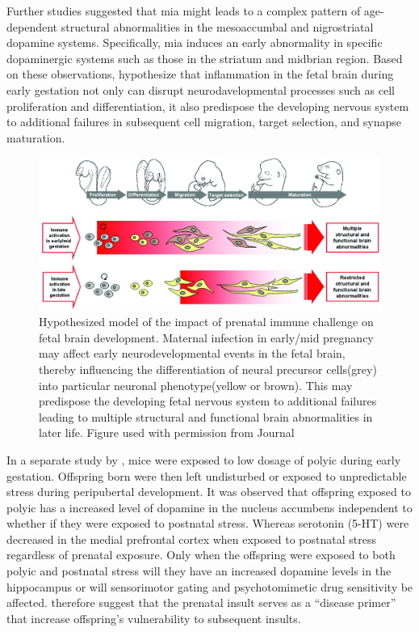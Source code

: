 \documentclass[12pt]{book}
\begin{document}
	Further studies suggested that \gls{mia} might leads to a complex pattern of age-dependent structural abnormalities in the mesoaccumbal and nigrostriatal dopamine systems\citep{Vuillermot2010}.
	Specifically, \gls{mia} induces an early abnormality in specific dopaminergic systems such as those in the striatum and midbrian region\citep{Vuillermot2010}.
	Based on these observations, \citet{Meyer2007a} hypothesize that inflammation in the fetal brain during early gestation not only can disrupt neurodavelopmental processes such as cell proliferation and differentiation, it also predispose the developing nervous system to additional failures in subsequent cell migration, target selection, and synapse maturation\citep{Meyer2007a}.
	\begin{figure}
		\centering
		\includegraphics[width=\textwidth]{figure/mia_impact.jpg}
		\caption[Hypothesized model of the impact of prenatal immune challenge on fetal brain development]{Hypothesized model of the impact of prenatal immune challenge on fetal brain development.
			Maternal infection in early/mid pregnancy may affect early neurodevelopmental events in the fetal brain, thereby influencing the differentiation of neural precursor cells(grey) into particular neuronal phenotype(yellow or brown).
			This may predispose the developing fetal nervous system to additional failures leading to multiple structural and functional brain abnormalities in later life.
			Figure used with permission from Journal\citep{Meyer2007a}}
	\end{figure}
	
	In a separate study by \citet{Giovanoli2013}, mice were exposed to low dosage of \gls{polyic} during early gestation.
	Offspring born were then left undisturbed or exposed to unpredictable stress during peripubertal development.
	It was observed that offspring exposed to \gls{polyic} has a increased level of dopamine in the nucleus accumbens independent to whether if they were exposed to postnatal stress.
	Whereas serotonin (5-HT) were decreased in the medial prefrontal cortex when exposed to postnatal stress regardless of prenatal exposure.
	Only when the offspring were exposed to both \gls{polyic} and postnatal stress will they have an increased dopamine levels in the hippocampus or will sensorimotor gating and psychotomimetic drug sensitivity be affected\citep{Giovanoli2013}.
	\citet{Giovanoli2013} therefore suggest that the prenatal insult serves as a ``disease primer'' that increase offspring's vulnerability to subsequent insults.
	
\end{document}
